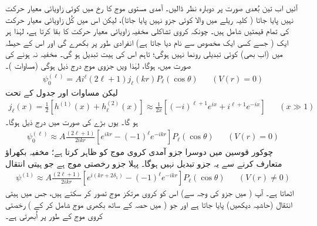 آئیں اب تین بُعدی صورت پر دوبارہ نظر ڈالیں۔ آمدی مستوی موج  کا  رخ میں کوئی زاویائی معیار حرکت نہیں پایا جاتا ( کلیہ ریلے میں  والا کوئی جزو نہیں پایا جاتا)، لیکن اس میں کُل زاویائی معیار حرکت  کی تمام قیمتیں شامل ہیں۔ چونکہ کروی تشاکلی مخفیہ زاویائی معیار حرکت کا بقا کرتا ہے، لہٰذا ہر ایک  ( جسے کسی ایک مخصوص  سے نام دیا جاتا ہے) انفرادی طور پر بکھرے گی اور اس کے حیطہ میں (اب بھی) کوئی تبدیلی رونما نہیں ہوگی؛ تاہم اس کی ہیت تبدیل ہو گی۔ مخفیہ نہ ہونے کی صورت میں،  ہوگا، لہٰذا ویں جزوی موج درج ذیل ہوگی (مساوات )۔
\begin{align}
	\psi_0^{(\ell)} = Ai^{\ell}(2\ell+1)j_{\ell}(kr)P_{\ell}(\cos\theta)&&(V(r)=0)
\end{align}
لیکن مساوات  اور جدول  کے تحت
\begin{align}
	j_{\ell}(x) = \frac{1}{2}\left[h^{(1)}(x)+h_{\ell}^{(2)}(x)\right]\approx\frac{1}{2x}\left[(-i)^{\ell+1}e^{ix}+i^{\ell+1}e^{-ix}\right]&&(x\gg1)
\end{align}
ہو گا۔ یوں بڑے  کی صورت میں درج ذیل ہوگا۔
\begin{align}
	\psi_0^{(\ell)}\approx A\frac{(2\ell+1)}{2ikr}\left[e^{ikr}-(-1)^{\ell}e^{-ikr}\right]P_{\ell}(\cos\theta)&&(V(r)=0)
\end{align}
چوکور قوسین میں دوسرا جزو آمدی کروی موج کو ظاہر کرتا ہے؛ مخفیہ بکھراؤ متعارف کرنے سے یہ جزو تبدیل نہیں ہوگا۔ پہلا جزو رخصتی موج ہے جو ہیتی انتقال 
\begin{align}\label{مساوات_بکھراو_عمومی_روپ}
	\psi^{(1)}\approx A\frac{(2\ell+1)}{2ikr}\left[e^{i(kr+2\delta_1)}-(-1)^{\ell}e^{-ikr}\right]P_{\ell}(\cos\theta)&&(V(r)\neq0)
\end{align}
 اٹھاتا ہے۔ آپ ( میں  جزو کی وجہ سے) اس کو کروی مرتکز موج تصور کر سکتے ہیں، جس میں  ہیتی انتقال (حاشیہ  دیکھیں) پایا جاتا ہے اور جو (  میں  حصہ کے ساتھ بکھری موج شامل کر کے ) رخصتی کروی موج کے طور پر اُبھرتی ہے۔

